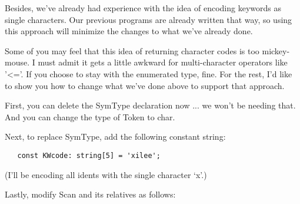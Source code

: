 Besides, we've already  had  experience with the idea of encoding keywords as single characters. Our previous programs are already written  that  way, so  using  this approach will  minimize  the changes to what we've already done.

Some of you may feel that this idea of returning  character codes is too mickey-mouse. I must  admit  it gets a little awkward for multi-character operators like '<='. If you choose to stay with the  enumerated  type, fine. For the rest, I'd like to show you how to change what we've done above to support that approach.

First, you can delete the SymType declaration now ... we won't be needing that. And you can change the type of Token to char.

Next, to replace SymType, add the following constant string:

\begin{verbatim}
   const KWcode: string[5] = 'xilee';
\end{verbatim}

(I'll be encoding all idents with the single character `x'.)

Lastly, modify Scan and its relatives as follows:

